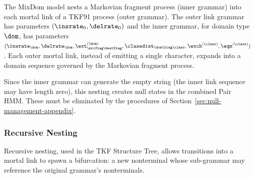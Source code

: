 \begin{example}
The MixDom model nests a Markovian fragment process (inner grammar)
into each mortal link of a TKF91 process (outer grammar).
The outer link grammar has parameters $(\insrate_0, \delrate_0)$ and the inner
grammar, for domain type $\dom$, has parameters
$(\insrate_\dom, \delrate_\dom, \ext^{(\dom)}_{\srcfrag\destfrag}, \classdist_{\dom\frag\class}, \exch^{(\class)}, \eqm^{(\class)})$.
Each outer mortal link, instead of emitting a single character,
expands into a domain sequence governed by the Markovian fragment process.

Since the inner grammar can generate the empty string
(the inner link sequence may have length zero), this nesting
creates null states in the combined Pair HMM.  These must be
eliminated by the procedures of Section~\ref{sec:null-management-appendix}.
\end{example}

\subsubsection{Recursive Nesting}
\label{sec:recursive-appendix}

Recursive nesting, used in the TKF Structure Tree, allows
transitions into a mortal link to spawn a bifurcation:
a new nonterminal whose sub-grammar may reference the
original grammar's nonterminals.

